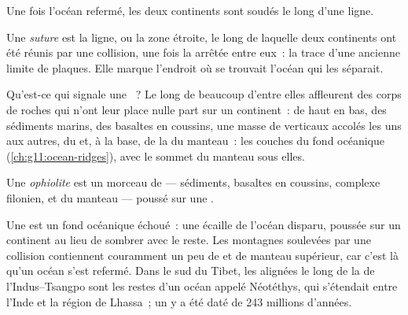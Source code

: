 Une fois l'océan refermé, les deux continents sont soudés le long d'une
ligne.

\begin{definition}[Suture]\label{def:g12:mountain-building:suture}
Une \emph{suture} est la ligne, ou la zone étroite, le long de
laquelle deux continents ont été réunis par une collision, une fois la
 arrêtée entre eux~: la trace d'une ancienne limite de plaques.
Elle marque l'endroit où se trouvait l'océan qui les séparait.
\end{definition}

Qu'est-ce qui signale une ~? Le long de beaucoup d'entre elles
affleurent des corps de roches qui n'ont leur place nulle part sur un
continent~: de haut en bas, des sédiments marins, des basaltes en coussins,
une masse de  verticaux accolés les uns aux autres, du  et, à la
base, de la  du manteau~: les couches du fond océanique
(\cref{ch:g11:ocean-ridges}), avec le sommet du manteau sous elles.

\begin{definition}[Ophiolite]\label{def:g12:mountain-building:ophiolite}
Une \emph{ophiolite} est un morceau de  --- sédiments, basaltes en coussins, complexe filonien,  et
 du manteau --- poussé sur une .
\end{definition}

Une  est un fond océanique échoué~: une écaille de l'océan
disparu, poussée sur un continent au lieu de sombrer avec le reste. Les
montagnes soulevées par une collision contiennent couramment un peu de
 et de manteau supérieur, car c'est là qu'un océan s'est
refermé. Dans le sud du Tibet, les  alignées le long de la 
de l'Indus--Tsangpo sont les restes d'un océan appelé Néotéthys, qui
s'étendait entre l'Inde et la région de Lhassa~; un  y a été daté de
243 millions d'années.

